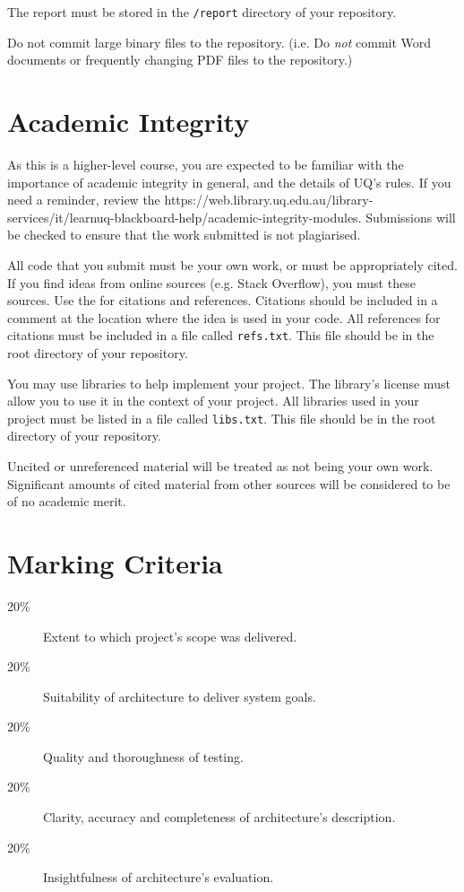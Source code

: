 \documentclass{csse4400}
\begin{document}
The report must be stored in the \texttt{/report} directory of your repository.

Do not commit large binary files to the repository.
(i.e. Do \emph{not} commit Word documents or frequently changing PDF files to the repository.)


\section{Academic Integrity}
As this is a higher-level course, you are expected to be familiar with the importance of academic integrity in general, and the details of UQ's rules.
If you need a reminder, review the 
{https://web.library.uq.edu.au/library-services/it/learnuq-blackboard-help/academic-integrity-modules}.
Submissions will be checked to ensure that the work submitted is not plagiarised.

All code that you submit must be your own work, or must be appropriately cited.
If you find ideas from online sources (e.g. Stack Overflow), you must  these sources.
Use the  for citations and references.
Citations should be included in a comment at the location where the idea is used in your code.
All references for citations must be included in a file called \texttt{refs.txt}.
This file should be in the root directory of your repository.

You may use libraries to help implement your project.
The library's license must allow you to use it in the context of your project.
All libraries used in your project must be listed in a file called \texttt{libs.txt}.
This file should be in the root directory of your repository.

Uncited or unreferenced material will be treated as not being your own work.
Significant amounts of cited material from other sources will be considered to be of no academic merit.


\section{Marking Criteria}

\begin{description}
    \item[20\%] Extent to which project's scope was delivered.
    \item[20\%] Suitability of architecture to deliver system goals.
    \item[20\%] Quality and thoroughness of testing.
    \item[20\%] Clarity, accuracy and completeness of architecture's description.
    \item[20\%] Insightfulness of architecture's evaluation.
\end{description}




\end{document}
